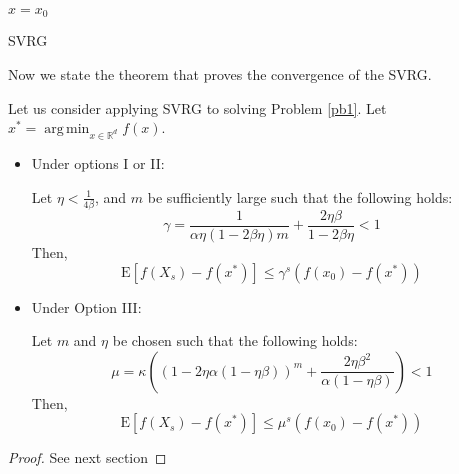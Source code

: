 \documentclass[12pt]{report}
\newcounter{theo}[section]
\newenvironment{theo}[2][]{%
    \refstepcounter{theo}
\newcommand*{\defeq}{\mathrel{\vcenter{\baselineskip0.5ex \lineskiplimit0pt
                     \hbox{\scriptsize.}\hbox{\scriptsize.}}}%
                     =} 
 
\begin{mdframed}[]\relax}{%
\end{mdframed}}
\newcommand{\E}{\mathrm{E}}
\DeclareMathOperator*\argmin{arg\,min}
\begin{document}
\begin{algorithm}[H]\label{SRG}
    $x=x_0$\;
    \caption{SVRG}
\end{algorithm}

Now we state the theorem that proves the convergence of the SVRG.

\begin{theo}
LLet us consider applying SVRG to solving Problem \ref{pb1}.
Let $x^*=\argmin_{x\in\mathbb{R}^d} f(x)$.
\begin{itemize}
    \item Under options I or II:
    
    Let $\eta<\frac{1}{4\beta}$, and $m$ be sufficiently large such that the following holds:
\begin{equation}
    \gamma=\frac{1}{\alpha\eta(1-2\beta\eta)m}+\frac{2\eta\beta}{1-2\beta\eta}<1
\end{equation}   
Then,
\begin{equation}
    \E[f(X_s)-f(x^*)]\leq \gamma^s(f(x_0)-f(x^*))
\end{equation}

    \item Under Option III:
    
    Let $m$ and $\eta$ be chosen such that the following holds:
\begin{equation}
    \mu=\kappa\left(\left(1-2\eta\alpha(1-\eta\beta)\right)^m+\frac{2\eta\beta^2}{\alpha(1-\eta\beta)}\right)<1
\end{equation}
Then,
\begin{equation}
    \E[f(X_s)-f(x^*)]\leq \mu^s(f(x_0)-f(x^*))
\end{equation}

\end{itemize}




\end{theo}
\begin{proof}
See next section
\end{proof}
\end{document}
